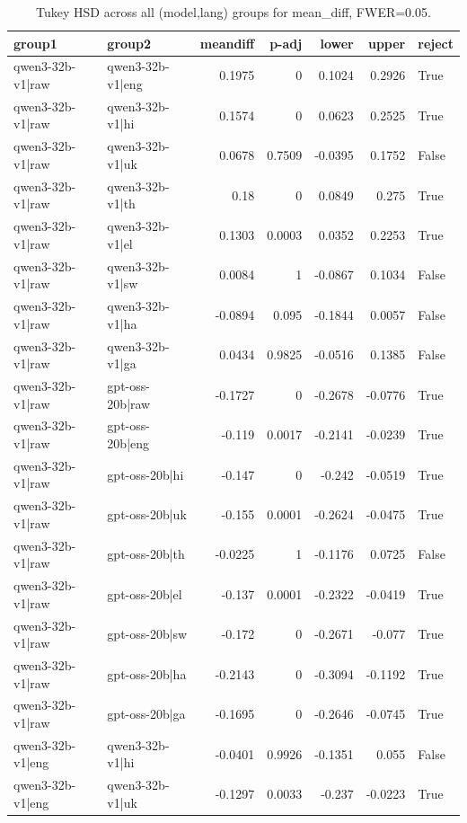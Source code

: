 \begin{table}
\caption{Tukey HSD across all (model,lang) groups for mean_diff, FWER=0.05.}
\label{tab:tukey_all_models_all_langs_mean_diff}
\begin{tabular}{l l r r r r l}
\toprule
group1 & group2 & meandiff & p-adj & lower & upper & reject \\
\midrule
qwen3-32b-v1|raw & qwen3-32b-v1|eng & 0.1975 & 0 & 0.1024 & 0.2926 & True \\
qwen3-32b-v1|raw & qwen3-32b-v1|hi & 0.1574 & 0 & 0.0623 & 0.2525 & True \\
qwen3-32b-v1|raw & qwen3-32b-v1|uk & 0.0678 & 0.7509 & -0.0395 & 0.1752 & False \\
qwen3-32b-v1|raw & qwen3-32b-v1|th & 0.18 & 0 & 0.0849 & 0.275 & True \\
qwen3-32b-v1|raw & qwen3-32b-v1|el & 0.1303 & 0.0003 & 0.0352 & 0.2253 & True \\
qwen3-32b-v1|raw & qwen3-32b-v1|sw & 0.0084 & 1 & -0.0867 & 0.1034 & False \\
qwen3-32b-v1|raw & qwen3-32b-v1|ha & -0.0894 & 0.095 & -0.1844 & 0.0057 & False \\
qwen3-32b-v1|raw & qwen3-32b-v1|ga & 0.0434 & 0.9825 & -0.0516 & 0.1385 & False \\
qwen3-32b-v1|raw & gpt-oss-20b|raw & -0.1727 & 0 & -0.2678 & -0.0776 & True \\
qwen3-32b-v1|raw & gpt-oss-20b|eng & -0.119 & 0.0017 & -0.2141 & -0.0239 & True \\
qwen3-32b-v1|raw & gpt-oss-20b|hi & -0.147 & 0 & -0.242 & -0.0519 & True \\
qwen3-32b-v1|raw & gpt-oss-20b|uk & -0.155 & 0.0001 & -0.2624 & -0.0475 & True \\
qwen3-32b-v1|raw & gpt-oss-20b|th & -0.0225 & 1 & -0.1176 & 0.0725 & False \\
qwen3-32b-v1|raw & gpt-oss-20b|el & -0.137 & 0.0001 & -0.2322 & -0.0419 & True \\
qwen3-32b-v1|raw & gpt-oss-20b|sw & -0.172 & 0 & -0.2671 & -0.077 & True \\
qwen3-32b-v1|raw & gpt-oss-20b|ha & -0.2143 & 0 & -0.3094 & -0.1192 & True \\
qwen3-32b-v1|raw & gpt-oss-20b|ga & -0.1695 & 0 & -0.2646 & -0.0745 & True \\
qwen3-32b-v1|eng & qwen3-32b-v1|hi & -0.0401 & 0.9926 & -0.1351 & 0.055 & False \\
qwen3-32b-v1|eng & qwen3-32b-v1|uk & -0.1297 & 0.0033 & -0.237 & -0.0223 & True \\

\end{tabular}
\end{table}

